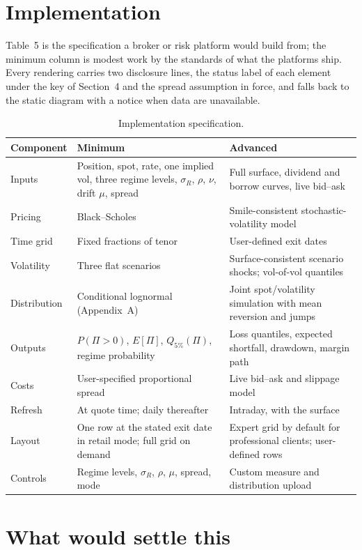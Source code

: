 \documentclass[11pt,a4paper]{article}
\begin{document}
\section{Implementation}

\noindent Table~5 is the specification a broker or risk platform would build from; the minimum column is modest work by the standards of what the platforms ship. Every rendering carries two disclosure lines, the status label of each element under the key of Section~4 and the spread assumption in force, and falls back to the static diagram with a notice when data are unavailable.

\begin{table}[htbp]
\centering\small
\caption{Implementation specification.}
\begin{tabular}{@{}L{2.4cm}L{5.0cm}L{5.6cm}@{}}
\toprule
Component & Minimum & Advanced \\
\midrule
Inputs & Position, spot, rate, one implied vol, three regime levels, $\sigma_R$, $\rho$, $\nu$, drift $\mu$, spread & Full surface, dividend and borrow curves, live bid--ask \\
Pricing & Black--Scholes & Smile-consistent stochastic-volatility model \\
Time grid & Fixed fractions of tenor & User-defined exit dates \\
Volatility & Three flat scenarios & Surface-consistent scenario shocks; vol-of-vol quantiles \\
Distribution & Conditional lognormal (Appendix~A) & Joint spot/volatility simulation with mean reversion and jumps \\
Outputs & $P(\Pi>0)$, $E[\Pi]$, $Q_{5\%}(\Pi)$, regime probability & Loss quantiles, expected shortfall, drawdown, margin path \\
Costs & User-specified proportional spread & Live bid--ask and slippage model \\
Refresh & At quote time; daily thereafter & Intraday, with the surface \\
Layout & One row at the stated exit date in retail mode; full grid on demand & Expert grid by default for professional clients; user-defined rows \\
Controls & Regime levels, $\sigma_R$, $\rho$, $\mu$, spread, mode & Custom measure and distribution upload \\
\bottomrule
\end{tabular}
\end{table}

\section{What would settle this}
\end{document}
